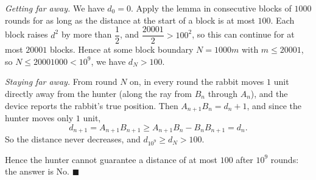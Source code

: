 \emph{Getting far away.} We have $d_0=0$. Apply the lemma in consecutive blocks of $1000$ rounds for as long as the distance at the start of a block is at most $100$. Each block raises $d^2$ by more than $\dfrac12$, and $\dfrac{20001}{2}>100^2$, so this can continue for at most $20001$ blocks. Hence at some block boundary $N=1000m$ with $m\le20001$, so $N\le20001000<10^9$, we have $d_N>100$.

\emph{Staying far away.} From round $N$ on, in every round the rabbit moves $1$ unit directly away from the hunter (along the ray from $B_n$ through $A_n$), and the device reports the rabbit's true position. Then $A_{n+1}B_n=d_n+1$, and since the hunter moves only $1$ unit,
\[d_{n+1}=A_{n+1}B_{n+1}\ge A_{n+1}B_n-B_nB_{n+1}=d_n.\]
So the distance never decreases, and $d_{10^9}\ge d_N>100$.

Hence the hunter cannot guarantee a distance of at most $100$ after $10^9$ rounds: the answer is $\boxed{\text{No}}$. $\blacksquare$
